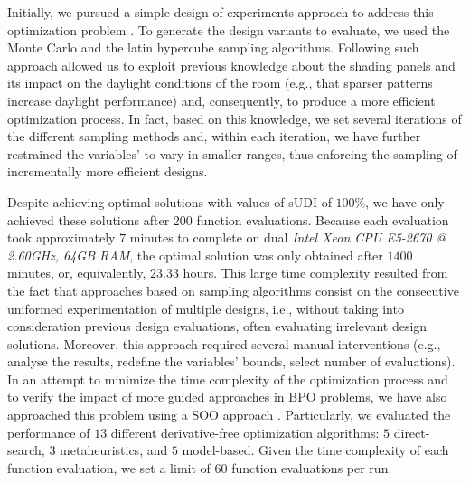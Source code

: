 Initially, we pursued a simple design of experiments approach to address this optimization problem \cite{Caetano2018}. To generate the design variants to evaluate, we used the Monte Carlo and the latin hypercube sampling algorithms. Following such approach allowed us to exploit previous knowledge about the shading panels and its impact on the daylight conditions of the room (e.g., that sparser patterns increase daylight performance) and, consequently, to produce a more efficient optimization process. In fact, based on this knowledge, we set several iterations of the different sampling methods and, within each iteration, we have further restrained the variables' to vary in smaller ranges, thus enforcing the sampling of incrementally more efficient designs. %


Despite achieving optimal solutions with values of sUDI of $100\%$, we have only achieved these solutions after 200 function evaluations. Because each evaluation took approximately $7$ minutes to complete on dual \textit{Intel Xeon CPU E5-2670 @ 2.60GHz, 64GB RAM}, the optimal solution was only obtained after $1400$ minutes, or, equivalently, $23.33$ hours. This large time complexity resulted from the fact that approaches based on sampling algorithms consist on the consecutive uniformed experimentation of multiple designs, i.e., without taking into consideration previous design evaluations, often evaluating irrelevant design solutions. Moreover, this approach required several manual interventions (e.g., analyse the results, redefine the variables' bounds, select number of evaluations). In an attempt to minimize the time complexity of the optimization process and to verify the impact of more guided approaches in \ac{BPO} problems, we have also approached this problem using a \ac{SOO} approach \cite{Belem2018optimizeddesign}. Particularly, we evaluated the performance of $13$ different derivative-free optimization algorithms: $5$ direct-search, $3$ metaheuristics, and $5$ model-based. Given the time complexity of each function evaluation, we set a limit of $60$ function evaluations per run.

